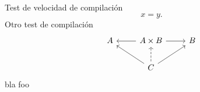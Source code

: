 \documentclass{article}
\begin{document}
Test de velocidad de compilación
\begin{equation*}
    x=y.
\end{equation*}
Otro test de compilación
\begin{equation*}
    \begin{tikzcd}
        A & A\times B\ar[r]\ar[l] & B\\
        & C\ar[ul]\ar[ru]\ar[u,dashed]
    \end{tikzcd}
\end{equation*}
bla foo
\end{document}
